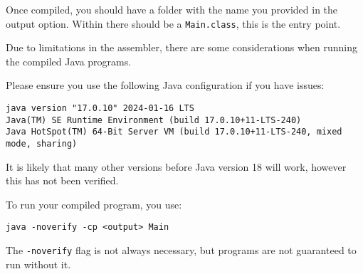 Once compiled, you should have a folder with the name you provided in the output option. Within there should be a \lstinline{Main.class}, this is the entry point.

Due to limitations in the assembler, there are some considerations when running the compiled Java programs.

Please ensure you use the following Java configuration if you have issues:

\begin{lstlisting}
java version "17.0.10" 2024-01-16 LTS
Java(TM) SE Runtime Environment (build 17.0.10+11-LTS-240)
Java HotSpot(TM) 64-Bit Server VM (build 17.0.10+11-LTS-240, mixed mode, sharing)
\end{lstlisting}

It is likely that many other versions before Java version 18 will work, however this has not been verified.

To run your compiled program, you use:

\begin{lstlisting}
java -noverify -cp <output> Main   
\end{lstlisting}

The \lstinline{-noverify} flag is not always necessary, but programs are not guaranteed to run without it.